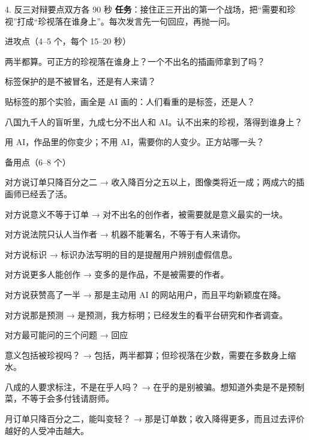 \documentclass[script,con]{debate}
\begin{document}
\begin{stage}{4. 反三对辩要点}{双方各 90 秒}
\textbf{任务}：接住正三开出的第一个战场，把“需要和珍视”打成“珍视落在谁身上”。每次发言先一句回应，再抛一问。
\begin{points}{进攻点（4–5 个，每个 15–20 秒）}
\item 两半都算。可正方的珍视落在谁身上？一个不出名的插画师拿到了吗？
\item 标签保护的是不被冒名，还是有人来请？
\item 贴标签的那个实验，画全是 AI 画的：人们看重的是标签，还是人？
\item 八国九千人的盲听里，九成七分不出人和 AI。认不出来的珍视，落得到谁身上？
\item 用 AI，作品里的你变少；不用 AI，需要你的人变少。正方站哪一头？
\end{points}
\begin{points}{备用点（6–8 个）}
\item 对方说订单只降百分之二 → 收入降百分之五以上，图像类将近一成；两成六的插画师已经丢了活。
\item 对方说意义不等于订单 → 对不出名的创作者，被需要就是意义最实的一块。
\item 对方说法院只认人当作者 → 机器不能署名，不等于有人来请你。
\item 对方说标识 → 标识办法写明的目的是提醒用户辨别虚假信息。
\item 对方说更多人能创作 → 变多的是作品，不是被需要的作者。
\item 对方说获赞高了一半 → 那是主动用 AI 的网站用户，而且平均新颖度在降。
\item 对方说那是预测 → 是预测，我方标明；已经发生的看平台研究和作者调查。
\end{points}
\begin{points}{对方最可能问的三个问题 → 回应}
\item 意义包括被珍视吗？ → 包括，两半都算；但珍视落在少数，需要在多数身上缩水。
\item 八成的人要求标注，不是在乎人吗？ → 在乎的是别被骗。想知道外卖是不是预制菜，不等于会多付钱请厨师。
\item 月订单只降百分之二，能叫变轻？ → 那是订单数；收入降得更多，而且过去评价越好的人受冲击越大。
\end{points}
\end{stage}
\end{document}
